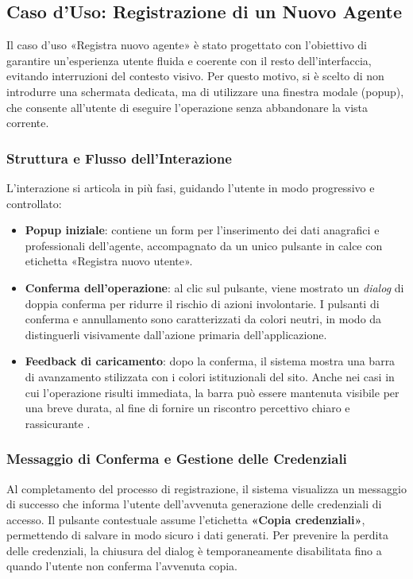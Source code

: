 

\subsection{Caso d'Uso: Registrazione di un Nuovo Agente}

Il caso d’uso «Registra nuovo agente» è stato progettato con l’obiettivo di garantire un’esperienza utente fluida e coerente con il resto dell’interfaccia, evitando interruzioni del contesto visivo. Per questo motivo, si è scelto di non introdurre una schermata dedicata, ma di utilizzare una finestra modale (popup), che consente all’utente di eseguire l’operazione senza abbandonare la vista corrente.

\vspace{0.5cm}
\subsubsection{Struttura e Flusso dell’Interazione}
L’interazione si articola in più fasi, guidando l’utente in modo progressivo e controllato:
\begin{itemize}
	\item \textbf{Popup iniziale}: contiene un form per l’inserimento dei dati anagrafici e professionali dell’agente, accompagnato da un unico pulsante in calce con etichetta «Registra nuovo utente».
	\item \textbf{Conferma dell’operazione}: al clic sul pulsante, viene mostrato un \textit{dialog} di doppia conferma per ridurre il rischio di azioni involontarie. I pulsanti di conferma e annullamento sono caratterizzati da colori neutri, in modo da distinguerli visivamente dall’azione primaria dell’applicazione.
	\item \textbf{Feedback di caricamento}: dopo la conferma, il sistema mostra una barra di avanzamento stilizzata con i colori istituzionali del sito. Anche nei casi in cui l’operazione risulti immediata, la barra può essere mantenuta visibile per una breve durata, al fine di fornire un riscontro percettivo chiaro e rassicurante \cite{nielsen1995}.
\end{itemize}

\vspace{0.5cm}
\subsubsection{Messaggio di Conferma e Gestione delle Credenziali}
Al completamento del processo di registrazione, il sistema visualizza un messaggio di successo che informa l’utente dell’avvenuta generazione delle credenziali di accesso.
Il pulsante contestuale assume l’etichetta \textbf{«Copia credenziali»}, permettendo di salvare in modo sicuro i dati generati.
Per prevenire la perdita delle credenziali, la chiusura del dialog è temporaneamente disabilitata fino a quando l’utente non conferma l’avvenuta copia.

